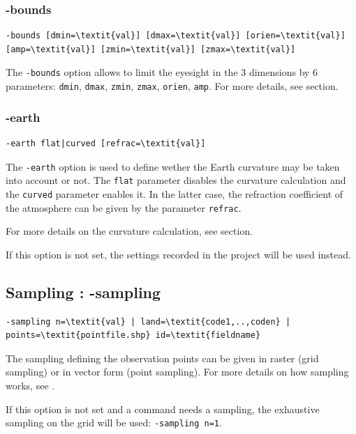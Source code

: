 \documentclass{report}
\begin{document}
\subsubsection{-bounds}
\begin{Verbatim}[commandchars=\\\{\}]
-bounds [dmin=\textit{val}] [dmax=\textit{val}] [orien=\textit{val}] [amp=\textit{val}] [zmin=\textit{val}] [zmax=\textit{val}]
\end{Verbatim}
The \verb|-bounds| option allows to limit the eyesight in the 3 dimensions by 6 parameters: \verb|dmin|, \verb|dmax|, \verb|zmin|, \verb|zmax|, \verb|orien|, \verb|amp|. For more details, see  section.

\subsubsection{-earth}
\begin{Verbatim}[commandchars=\\\{\}]
-earth flat|curved [refrac=\textit{val}]
\end{Verbatim}

The \verb|-earth| option is used to define wether the Earth curvature may be taken into account or not. The \verb|flat| parameter disables the curvature calculation and the \verb|curved| parameter enables it. In the latter case, the refraction coefficient of the atmosphere can be given by the parameter \verb|refrac|.

For more details on the curvature calculation, see  section.

If this option is not set, the settings recorded in the project will be used instead.


\subsection{Sampling : -sampling}
\begin{Verbatim}[commandchars=\\\{\}]
-sampling n=\textit{val} | land=\textit{code1,..,coden} | points=\textit{pointfile.shp} id=\textit{fieldname}
\end{Verbatim}
The sampling defining the observation points can be given in raster (grid sampling) or in vector form (point sampling). For more details on how sampling works, see .

If this option is not set and a command needs a sampling, the exhaustive sampling on the grid will be used: \verb|-sampling n=1|.
\end{document}
